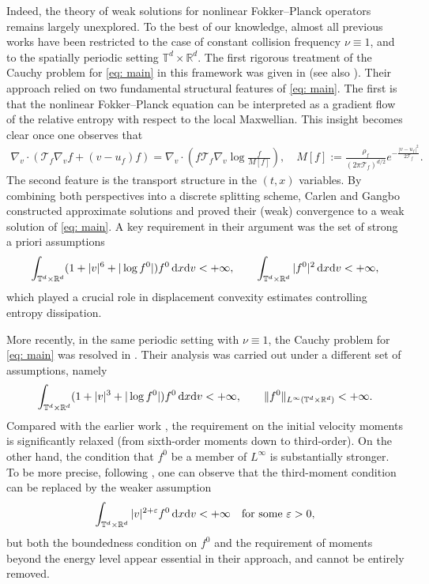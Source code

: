 \documentclass[10pt, reqno]{amsart}
\theoremstyle{plain}
\theoremstyle{definition}
\theoremstyle{remark}
\numberwithin{equation}{section}
\newcommand{\calT}{\mathcal T}
\newcommand{\R}{\mathbb{R}}
\newcommand{\T}{\mathbb{T}}
\newcommand{\ve}{\varepsilon}
\newcommand{\dx}{\textnormal{d}x}
\newcommand{\dv}{\textnormal{d}v}
\newcommand{\lt}{\left}
\newcommand{\rt}{\right}
\begin{document}
Indeed, the theory of weak solutions for nonlinear Fokker--Planck operators remains largely unexplored. To the best of our knowledge, almost all previous works have been restricted to the case of constant collision frequency $\nu \equiv 1$, and to the spatially periodic setting $\T^d \times \R^d$. The first rigorous treatment of the Cauchy problem for \eqref{eq: main} in this framework was given in \cite{CG04} (see also \cite{CG03}). Their approach relied on two fundamental structural features of \eqref{eq: main}. The first is that the nonlinear Fokker--Planck equation can be interpreted as a gradient flow of the relative entropy with respect to the local Maxwellian. This insight becomes clear once one observes that
    \begin{align*}
        \nabla_v\cdot \lt(\calT_f \nabla_v f + (v-u_f) f \rt) = \nabla_v \cdot \lt(f \calT_f \nabla_v \log \frac{f}{M[f]} \rt), \quad M[f] := \frac{\rho_f}{(2\pi \calT_f)^{d/2}} e^{-\frac{|v-u_f|^2}{2\calT_f}}.
    \end{align*}
The second feature is the transport structure in the $(t,x)$ variables. By combining both perspectives into a discrete splitting scheme, Carlen and Gangbo constructed approximate solutions and proved their (weak) convergence to a weak solution of \eqref{eq: main}. A key requirement in their argument was the set of strong a priori assumptions
    \begin{align}\label{eq: CG}
        \int_{\T^d\times\R^d} (1 + |v|^6 + |\log f^0|) f^0 \,\dx\dv < +\infty, \qquad \int_{\T^d\times\R^d} |f^0|^2 \,\dx\dv < +\infty,
    \end{align}
which played a crucial role in displacement convexity estimates controlling entropy dissipation.
    
More recently, in the same periodic setting with $\nu \equiv 1$, the Cauchy problem for \eqref{eq: main} was resolved in \cite{CHY25}. Their analysis was carried out under a different set of assumptions, namely
    \begin{align}\label{eq: CHY}
        \int_{\T^d\times\R^d} (1+|v|^3+|\log f^0|) f^0 \,\dx\dv < +\infty, \qquad \|f^0\|_{L^\infty(\T^d\times\R^d)} < +\infty.
    \end{align}
Compared with the earlier work \cite{CG04}, the requirement on the initial velocity moments is significantly relaxed (from sixth-order moments down to third-order). On the other hand, the condition that $f^0$ be a member of $L^\infty$ is substantially stronger. To be more precise, following \cite{CHY25}, one can observe that the third-moment condition can be replaced by the weaker assumption
    \begin{align*}
        \int_{\T^d\times\R^d} |v|^{2+\ve} f^0 \,\dx\dv < +\infty \quad \textnormal{for some $\ve>0$},
    \end{align*}
but both the boundedness condition on $f^0$ and the requirement of moments beyond the energy level appear essential in their approach, and cannot be entirely removed.
\end{document}
